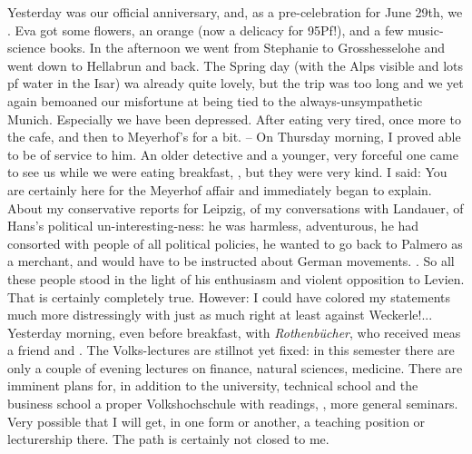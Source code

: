 
Yesterday was our official anniversary, and, as a pre-celebration for June 29th, we . Eva got some flowers, an orange (now a delicacy for 95Pf!), and a few music-science books. In the afternoon we went from Stephanie to Grosshesselohe and went down to Hellabrun and back. The Spring day (with the Alps visible and lots pf water in the Isar) wa already quite lovely, but the trip was too long and we yet again bemoaned our misfortune at being tied to the always-unsympathetic Munich. Especially  we have been depressed. After eating very tired, once more to the cafe, and then to Meyerhof's for a bit. -- On Thursday morning, I proved able to be of service to him. An older detective and a younger, very forceful one came to see us while we were eating breakfast, , but they were very kind. I said: You are certainly here for the Meyerhof affair and immediately began to explain. About my conservative reports for Leipzig, of my conversations with Landauer, of Hans's political un-interesting-ness: he was harmless, adventurous, he had consorted with people of all political policies, he wanted to go back to Palmero as a merchant, and would have to be instructed about German movements. . So all these people stood in the light of his enthusiasm and violent opposition to Levien. That is certainly completely true. However: I could have colored my statements much more distressingly with just as much right at least against Weckerle!... \missing Yesterday morning, even before breakfast, with \textit{Rothenbücher}, who received meas a friend and . The Volks-lectures are stillnot yet fixed: in this semester there are only a couple of evening lectures on finance, natural sciences, medicine. There are imminent plans for, in addition to the university, technical school and the business school a proper Volkshochschule with readings, , more general seminars. Very possible that I will get, in one form or another, a teaching position or lecturership there. The path is certainly not closed to me. \missing

